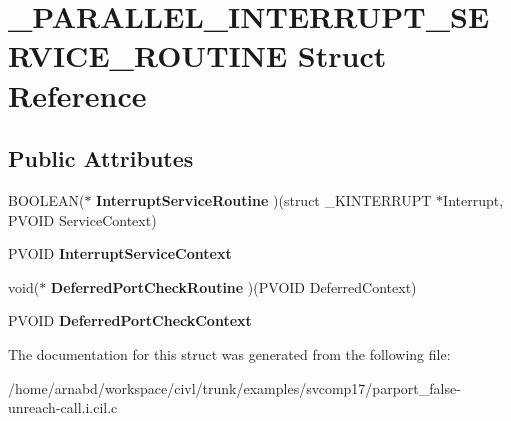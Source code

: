 \hypertarget{struct__PARALLEL__INTERRUPT__SERVICE__ROUTINE}{}\section{\+\_\+\+P\+A\+R\+A\+L\+L\+E\+L\+\_\+\+I\+N\+T\+E\+R\+R\+U\+P\+T\+\_\+\+S\+E\+R\+V\+I\+C\+E\+\_\+\+R\+O\+U\+T\+I\+N\+E Struct Reference}
\label{struct__PARALLEL__INTERRUPT__SERVICE__ROUTINE}
\subsection*{Public Attributes}
\begin{DoxyCompactItemize}
\item 
\hypertarget{struct__PARALLEL__INTERRUPT__SERVICE__ROUTINE_acdf64662a55b5faa0c74fb954326229e}{}B\+O\+O\+L\+E\+A\+N($\ast$ {\bfseries Interrupt\+Service\+Routine} )(struct \+\_\+\+K\+I\+N\+T\+E\+R\+R\+U\+P\+T $\ast$Interrupt, P\+V\+O\+I\+D Service\+Context)\label{struct__PARALLEL__INTERRUPT__SERVICE__ROUTINE_acdf64662a55b5faa0c74fb954326229e}

\item 
\hypertarget{struct__PARALLEL__INTERRUPT__SERVICE__ROUTINE_a63228be594765ef4dda45f090e13c07f}{}P\+V\+O\+I\+D {\bfseries Interrupt\+Service\+Context}\label{struct__PARALLEL__INTERRUPT__SERVICE__ROUTINE_a63228be594765ef4dda45f090e13c07f}

\item 
\hypertarget{struct__PARALLEL__INTERRUPT__SERVICE__ROUTINE_aad8eb965b17ba4e5ed629edd4950119f}{}void($\ast$ {\bfseries Deferred\+Port\+Check\+Routine} )(P\+V\+O\+I\+D Deferred\+Context)\label{struct__PARALLEL__INTERRUPT__SERVICE__ROUTINE_aad8eb965b17ba4e5ed629edd4950119f}

\item 
\hypertarget{struct__PARALLEL__INTERRUPT__SERVICE__ROUTINE_ad0b02188bf3f22f3920d7d48c47bc804}{}P\+V\+O\+I\+D {\bfseries Deferred\+Port\+Check\+Context}\label{struct__PARALLEL__INTERRUPT__SERVICE__ROUTINE_ad0b02188bf3f22f3920d7d48c47bc804}

\end{DoxyCompactItemize}


The documentation for this struct was generated from the following file\+:\begin{DoxyCompactItemize}
\item 
/home/arnabd/workspace/civl/trunk/examples/svcomp17/parport\+\_\+false-\/unreach-\/call.\+i.\+cil.\+c\end{DoxyCompactItemize}
